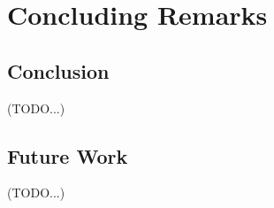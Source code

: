 \chapter{Concluding Remarks}\label{chap:conclusion}

\section{Conclusion}
(TODO...)

\section{Future Work}
(TODO...)